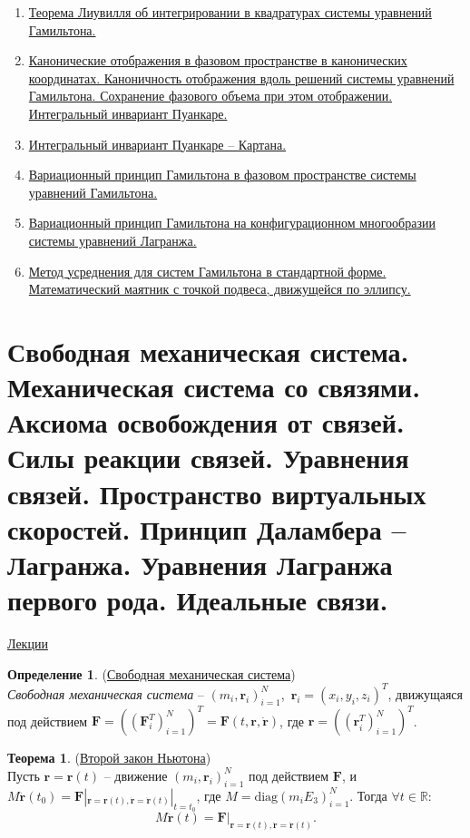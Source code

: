 \documentclass[specialist, subf, href, colorlinks=true, 12pt, times, mtpro, final]{disser}
\theoremstyle{definition}
\newtheorem{defn}{Определение}[section]
\newtheorem{theorem}{Теорема}[section]
\def\bfr{\mathbf{r}}
\def\bfrd{\dot{\bfr}}
\def\bfrdd{\ddot{\bfr}}
\def\bfF{\mathbf{F}}
\begin{document}
\begin{enumerate}
    \item \hyperref[21]{Теорема Лиувилля об интегрировании в квадратурах системы уравнений Гамильтона.}
    \item \hyperref[22]{Канонические отображения в фазовом пространстве в канонических координатах. Каноничность отображения вдоль решений системы уравнений Гамильтона. Сохранение фазового объема при этом отображении. Интегральный инвариант Пуанкаре.}
    \item \hyperref[23]{Интегральный инвариант Пуанкаре – Картана.}
    \item \hyperref[24]{Вариационный принцип Гамильтона в фазовом пространстве системы уравнений Гамильтона.}
    \item \hyperref[25]{Вариационный принцип Гамильтона на конфигурационном многообразии системы уравнений Лагранжа.}
    \item \hyperref[26]{Метод усреднения для систем Гамильтона в стандартной форме. Математический маятник с точкой подвеса, движущейся по эллипсу.}
    \end{enumerate}

    \section{Свободная механическая система. Механическая система со связями. Аксиома освобождения от связей. Силы реакции связей. Уравнения связей. Пространство виртуальных скоростей. Принцип Даламбера – Лагранжа. Уравнения Лагранжа первого рода. Идеальные связи.}
    \label{1}
    \hyperlink {first_lects.1}{Лекции}
    \begin{defn} (\hyperlink{first_lects.1}{Свободная механическая система})\\
    {\it Свободная механическая система} -- $(m_i, \bfr_i)_{i=1}^N$,\ 
    $\bfr_i = (x_i, y_i, z_i)^T$, движущаяся под действием $\bfF = \left((\bfF_i^T)_{i=1}^N\right)^T
    = \bfF(t,\bfr,\bfrd)$, где $\bfr = \left((\bfr_i^T)_{i=1}^N\right)^T$.
    \end{defn}
    \begin{theorem} (\hyperlink{first_lects.1}{Второй закон Ньютона})\\
    Пусть $\bfr=\bfr(t)$ -- движение $(m_i, \bfr_i)_{i=1}^N$ под действием $\bfF$,
    и $M\bfrdd(t_0) = \bfF|_{\bfr = \bfr(t), \bfrd=\bfrd(t)}|_{t=t_0}$, где
    $M = \text{diag}(m_iE_3)_{i=1}^N$. Тогда $\forall t \in \mathbb{R}$:
    $$M\bfrdd(t) = \bfF|_{\bfr=\bfr(t), \bfrd = \bfrd(t)}.$$
    \end{theorem}
    
\end{document}
